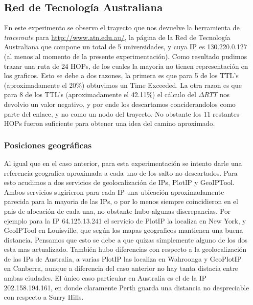 \subsection{Red de Tecnología Australiana}

En este experimento se observo el trayecto que nos devuelve la herramienta de \textit{traceroute} para \url{http://www.atn.edu.au/}, la página de la Red de Tecnología Australiana que compone un total de 5 universidades, y cuya IP es 130.220.0.127 (al menos al momento de la presente experimentación). Como resultado pudimos trazar una ruta de 24 HOPs, de los cuales la mayoria no tienen representación en los graficos. Esto se debe a dos razones, la primera es que para 5 de los TTL's (aproximadamente el 20\%) obtuvimos un Time Exceeded. La otra razon es que para 8 de los TTL's (aproximadamente el 42.11\%) el cálculo del $\Delta RTT$ nos devolvio un valor negativo, y por ende los descartamos conciderandolos como parte del enlace, y no como un nodo del trayecto. No obstante los 11 restantes HOPs fueron suficiente para obtener una idea del camino aproximado.

\subsubsection{Posiciones geográficas}

Al igual que en el caso anterior, para esta experimentación se intento darle una referencia geografica aproximada a cada uno de los salto no descartados. Para esto acudimos a dos servicios de geolocalización de IPs, PlotIP y GeoIPTool. Ambos servicios sugirieron para cada IP una ubicación aproximadamente parecida para la mayoria de las IPs, o por lo menos siempre coincidieron en el pais de alocación de cada una, no obstante hubo algunas discrepancias. Por ejemplo para la IP 64.125.13.241 el servicio de PlotIP la localiza en New York, y GeoIPTool en Louisville, que según los mapas geograficos mantienen una buena distancia. Pensamos que esto se debe a que quizas simplemente alguno de los dos esta mas actualizado. También hubo diferencias con respecto a la geolocalización de las IPs de Australia, a varias PlotIP las localiza en Wahroonga y GeoPlotIP en Canberra, aunque a diferencia del caso anterior no hay tanta distacia entre ambas ciudades. El único caso particular en Australia es el de la IP 202.158.194.161, en donde claramente Perth guarda una distancia no despreciable con respecto a Surry Hills.

